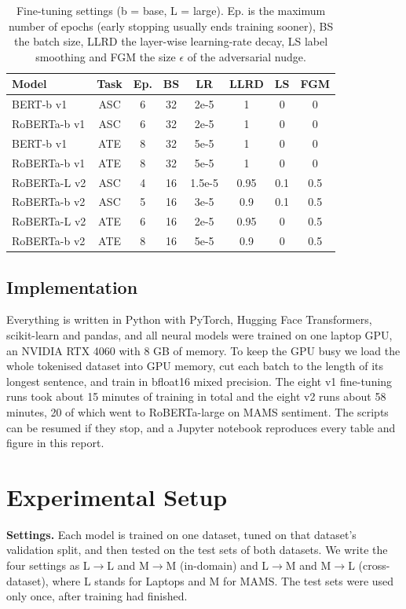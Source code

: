 \documentclass[11pt]{article}
\begin{document}
\begin{table}[t]
\centering
\footnotesize
\begin{tabular}{lccccccc}
\toprule
Model & Task & Ep. & BS & LR & LLRD & LS & FGM \\
\midrule
BERT-b v1 & ASC & 6 & 32 & 2e-5 & 1 & 0 & 0 \\
RoBERTa-b v1 & ASC & 6 & 32 & 2e-5 & 1 & 0 & 0 \\
BERT-b v1 & ATE & 8 & 32 & 5e-5 & 1 & 0 & 0 \\
RoBERTa-b v1 & ATE & 8 & 32 & 5e-5 & 1 & 0 & 0 \\
RoBERTa-L v2 & ASC & 4 & 16 & 1.5e-5 & 0.95 & 0.1 & 0.5 \\
RoBERTa-b v2 & ASC & 5 & 16 & 3e-5 & 0.9 & 0.1 & 0.5 \\
RoBERTa-L v2 & ATE & 6 & 16 & 2e-5 & 0.95 & 0 & 0.5 \\
RoBERTa-b v2 & ATE & 8 & 16 & 5e-5 & 0.9 & 0 & 0.5 \\
\bottomrule
\end{tabular}
\caption{Fine-tuning settings (b = base, L = large). Ep. is the maximum number of epochs (early stopping usually ends training sooner), BS the batch size, LLRD the layer-wise learning-rate decay, LS label smoothing and FGM the size $\epsilon$ of the adversarial nudge.}
\label{tab:hparams}
\end{table}

\subsection{Implementation}
Everything is written in Python with PyTorch, Hugging Face Transformers, scikit-learn and pandas, and all neural models were trained on one laptop GPU, an NVIDIA RTX 4060 with 8 GB of memory. To keep the GPU busy we load the whole tokenised dataset into GPU memory, cut each batch to the length of its longest sentence, and train in bfloat16 mixed precision. The eight v1 fine-tuning runs took about 15 minutes of training in total and the eight v2 runs about 58 minutes, 20 of which went to RoBERTa-large on MAMS sentiment. The scripts can be resumed if they stop, and a Jupyter notebook reproduces every table and figure in this report.

\section{Experimental Setup}
\textbf{Settings.} Each model is trained on one dataset, tuned on that dataset's validation split, and then tested on the test sets of both datasets. We write the four settings as L$\to$L and M$\to$M (in-domain) and L$\to$M and M$\to$L (cross-dataset), where L stands for Laptops and M for MAMS. The test sets were used only once, after training had finished.
\end{document}
